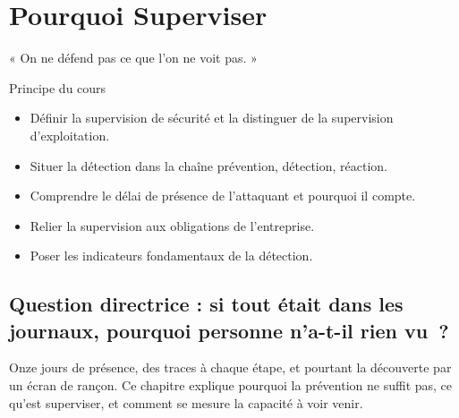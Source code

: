 
\chapter{Pourquoi Superviser}
\label{chap:pourquoi}

\epigraph{%
    « On ne défend pas ce que l'on ne voit pas. »%
}{Principe du cours}


\begin{boxobjectifs}
\begin{itemize}
    \item Définir la supervision de sécurité et la distinguer de la
          supervision d'exploitation.
    \item Situer la détection dans la chaîne prévention, détection, réaction.
    \item Comprendre le délai de présence de l'attaquant et pourquoi il
          compte.
    \item Relier la supervision aux obligations de l'entreprise.
    \item Poser les indicateurs fondamentaux de la détection.
\end{itemize}
\end{boxobjectifs}

\bigskip

\section*{Question directrice : si tout était dans les journaux, pourquoi personne n'a-t-il rien vu~?}

Onze jours de présence, des traces à chaque étape, et pourtant la découverte
par un écran de rançon. Ce chapitre explique pourquoi la prévention ne suffit
pas, ce qu'est superviser, et comment se mesure la capacité à voir venir.

